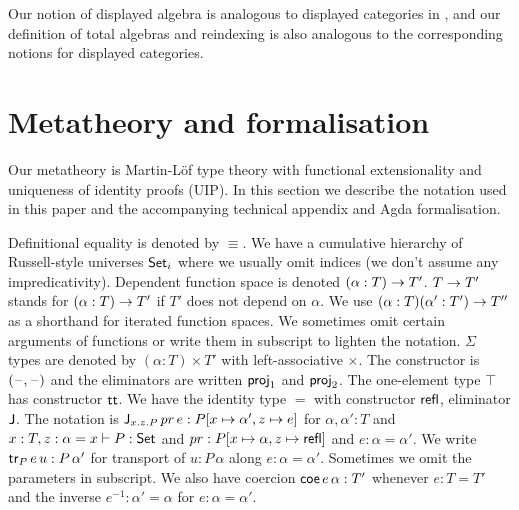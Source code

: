 \documentclass[acmsmall,screen]{acmart}
\begin{document}
Our notion of displayed algebra is analogous to displayed categories
in \cite{displayedCategories}, and our definition of total algebras
and reindexing is also analogous to the corresponding notions for
displayed categories.


\section{Metatheory and formalisation}
\label{sec:metatheory}

Our metatheory is Martin-L{\"o}f type theory with functional
extensionality and uniqueness of identity proofs (UIP). In this
section we describe the notation used in this paper and the
accompanying technical appendix and Agda formalisation.

Definitional equality is denoted by $\equiv$. We have a cumulative
hierarchy of Russell-style universes $\Set_i$ where we usually omit
indices (we don't assume any impredicativity). Dependent function
space is denoted $(\alpha:T)\ra T'$. $T\ra T'$ stands for
$(\alpha:T)\ra T'$ if $T'$ does not depend on $\alpha$. We use
$(\alpha:T)(\alpha': T')\ra T''$ as a shorthand for iterated function
spaces. We sometimes omit certain arguments of functions or write them
in subscript to lighten the notation.  $\Sigma$ types are denoted by
$(\alpha:T)\times T'$ with left-associative $\times$. The constructor
is $(\blank,\blank)$ and the eliminators are written $\proj_1$ and
$\proj_2$. The one-element type $\top$ has constructor $\tt$. We have
the identity type $=$ with constructor $\refl$, eliminator $\J$. The
notation is $\J_{x.z.P}\,pr\,e:P[x\mapsto\alpha',z\mapsto e]$ for
$\alpha,\alpha':T$ and $x:T, z:\alpha=x \vdash P:\Set$ and
$pr:P[x\mapsto \alpha,z\mapsto\refl]$ and $e :\alpha=\alpha'$. We
write $\tr_P\,e\,u: P\,\alpha'$ for transport of $u : P\,\alpha$ along
$e :\alpha=\alpha'$. Sometimes we omit the parameters in subscript. We
also have coercion $\coe\,e\,\alpha:T'$ whenever $e:T=T'$ and the
inverse $e^{-1}:\alpha'=\alpha$ for $e:\alpha=\alpha'$.
\end{document}
